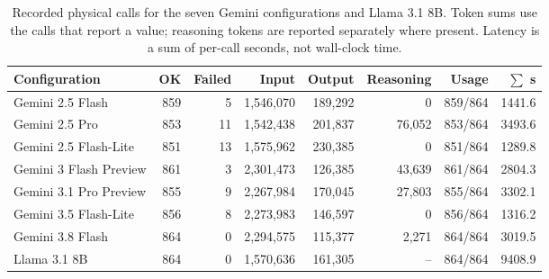 \documentclass[acmsmall,review]{acmart}
\begin{document}
\begin{table}[H]
\centering
\caption{Recorded physical calls for the seven Gemini configurations and Llama 3.1 8B. Token sums use the calls that report a value; reasoning tokens are reported separately where present. Latency is a sum of per-call seconds, not wall-clock time.}\label{tab:C3}
\footnotesize
\setlength{\tabcolsep}{4pt}
\begin{tabular}{@{}lrrrrrrr@{}}
\toprule
\textbf{Configuration} & \textbf{OK} & \textbf{Failed} & \textbf{Input} & \textbf{Output} & \textbf{Reasoning} & \textbf{Usage} & \textbf{$\sum$ s} \\
\midrule
Gemini 2.5 Flash & 859 & 5 & 1,546,070 & 189,292 & 0 & 859/864 & 1441.6 \\
Gemini 2.5 Pro & 853 & 11 & 1,542,438 & 201,837 & 76,052 & 853/864 & 3493.6 \\
Gemini 2.5 Flash-Lite & 851 & 13 & 1,575,962 & 230,385 & 0 & 851/864 & 1289.8 \\
Gemini 3 Flash Preview & 861 & 3 & 2,301,473 & 126,385 & 43,639 & 861/864 & 2804.3 \\
Gemini 3.1 Pro Preview & 855 & 9 & 2,267,984 & 170,045 & 27,803 & 855/864 & 3302.1 \\
Gemini 3.5 Flash-Lite & 856 & 8 & 2,273,983 & 146,597 & 0 & 856/864 & 1316.2 \\
Gemini 3.8 Flash & 864 & 0 & 2,294,575 & 115,377 & 2,271 & 864/864 & 3019.5 \\
Llama 3.1 8B & 864 & 0 & 1,570,636 & 161,305 & -- & 864/864 & 9408.9 \\
\bottomrule
\end{tabular}
\end{table}
\end{document}
